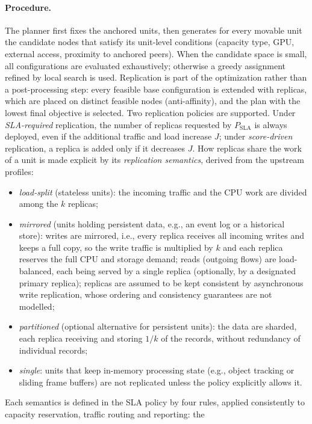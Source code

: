 \paragraph{Procedure.}
The planner first fixes the anchored units, then generates for every movable
unit the candidate nodes that satisfy its unit-level conditions (capacity
type, GPU, external access, proximity to anchored peers). When the candidate
space is small, all configurations are evaluated exhaustively; otherwise a
greedy assignment refined by local search is used. Replication is part of the
optimization rather than a post-processing step: every feasible base
configuration is extended with replicas, which are placed on distinct feasible
nodes (anti-affinity), and the plan with the lowest final objective is
selected. Two replication policies are supported. Under \emph{SLA-required}
replication, the number of replicas requested by $P_{\mathrm{SLA}}$ is always
deployed, even if the additional traffic and load increase $J$; under
\emph{score-driven} replication, a replica is added only if it decreases $J$.
How replicas share the work of a unit is made explicit by its
\emph{replication semantics}, derived from the upstream profiles:
\begin{itemize}
\item \emph{load-split} (stateless units): the incoming traffic and the CPU
work are divided among the $k$ replicas;
\item \emph{mirrored} (units holding persistent data, e.g., an event log or a
historical store): writes are mirrored, i.e., every replica receives all
incoming writes and keeps a full copy, so the write traffic is multiplied by
$k$ and each replica reserves the full CPU and storage demand; reads (outgoing
flows) are load-balanced, each being served by a single replica (optionally,
by a designated primary replica); replicas are assumed to be kept consistent by
asynchronous write replication, whose ordering and consistency guarantees are
not modelled;
\item \emph{partitioned} (optional alternative for persistent units): the data
are sharded, each replica receiving and storing $1/k$ of the records, without
redundancy of individual records;
\item \emph{single}: units that keep in-memory processing state (e.g., object
tracking or sliding frame buffers) are not replicated unless the policy
explicitly allows it.
\end{itemize}
Each semantics is defined in the SLA policy by four rules, applied
consistently to capacity reservation, traffic routing and reporting: the
